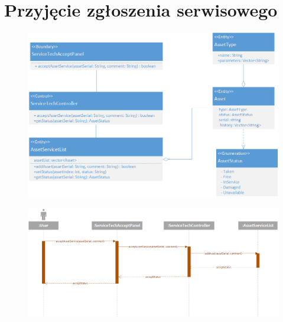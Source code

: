 \documentclass[11pt, a4paper, oneside]{report}
\begin{document}
\section{Przyjęcie zgłoszenia serwisowego}
\begin{figure}[H]
\centering
\includegraphics[scale=0.5]{przyjecie_zgloszenia_serwis_class.png}
\end{figure}
\begin{figure}[H]
\centering
\includegraphics[scale=0.5]{przyjecie_zgloszenia_serwis_sequence.png}
\end{figure}
\end{document}
